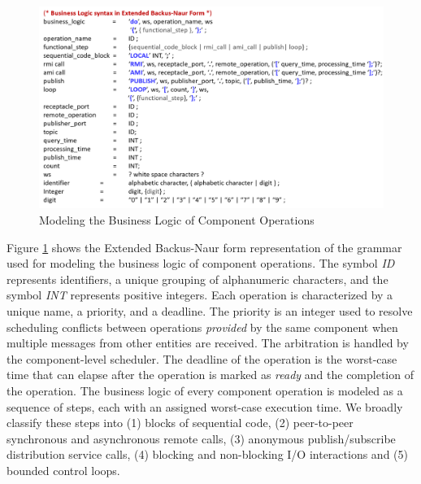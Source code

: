 \begin{figure}[ht]
	\centering
	\includegraphics[width=\textwidth]{./img/BL-EBNF}
	\caption{Modeling the Business Logic of Component Operations}
	\label{fig:ebnf}
\end{figure}

Figure \ref{fig:ebnf} shows the Extended Backus-Naur form representation of the grammar \cite{SEUS} used for modeling the business logic of component operations. The symbol \emph{ID} represents identifiers, a unique grouping of alphanumeric characters, and the symbol \emph{INT} represents positive integers. Each operation is characterized by a unique name, a priority, and a deadline. The priority is an integer used to resolve scheduling conflicts between operations \emph{provided} by the same component when multiple messages from other entities are received. The arbitration is handled by the component-level scheduler. The deadline of the operation is the worst-case time that can elapse after the operation is marked as \emph{ready} and the completion of the operation. The business logic of every component operation is modeled as a sequence of steps, each with an assigned worst-case execution time. We broadly classify these steps into (1) blocks of sequential code, (2) peer-to-peer synchronous and asynchronous remote calls, (3) anonymous publish/subscribe distribution service calls, (4) blocking and non-blocking I/O interactions and (5) bounded control loops. 

